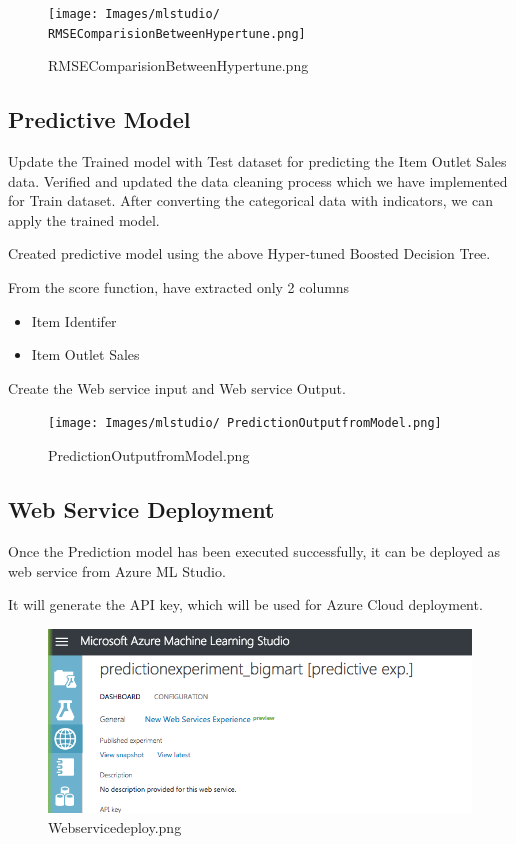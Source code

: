 \begin{figure}[pic4]
\centering
\texttt{[image: Images/mlstudio/
RMSEComparisionBetweenHypertune.png]}
\caption{RMSEComparisionBetweenHypertune.png}
\label{fig:RMSEComparisionBetweenHypertune}
\end{figure}

\subsection{Predictive Model}
Update the Trained model with Test dataset for predicting the Item Outlet 
Sales data. Verified and updated the data cleaning process which we have 
implemented for Train dataset. After converting the categorical data with 
indicators, we can apply the trained model.

Created predictive model using the above Hyper-tuned Boosted Decision Tree.

From the score function, have extracted only 2 columns
\begin{itemize}
\item Item Identifer
\item Item Outlet Sales
\end{itemize}

Create the Web service input and Web service Output.

\begin{figure}[pic5]
\centering
\texttt{[image: Images/mlstudio/
PredictionOutputfromModel.png]}
\caption{PredictionOutputfromModel.png}
\label{fig:PredictionOutputfromModel}
\end{figure}

\subsection{Web Service Deployment}
Once the Prediction model has been executed successfully, it can be deployed 
as web service from Azure ML Studio.

It will generate the API key, which will be used for Azure Cloud deployment.

\begin{figure}[pic6]
\centering
\includegraphics[width=\columnwidth]{Images/mlstudio/Webservicedeploy.png}
\caption{Webservicedeploy.png}
\label{fig:Webservicedeploy}
\end{figure}

